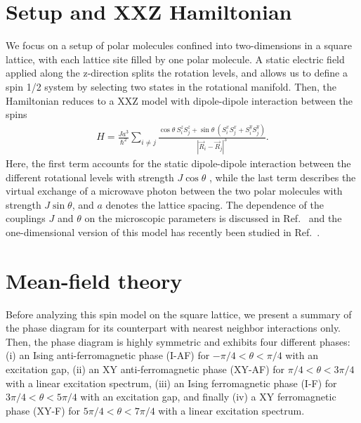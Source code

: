 \section{Setup and XXZ Hamiltonian}
We focus on a setup of polar molecules confined into two-dimensions in a square lattice,
with each lattice site filled by one polar molecule. A static electric field applied along
the z-direction splits the rotation levels, and allows us to define a spin 1/2 system by selecting
two states in the rotational manifold. Then, the Hamiltonian reduces to a XXZ model with dipole-dipole interaction
between the spins \cite{Gorshkov2011}
%
\begin{align}
H = \frac{J a^3}{\hbar^2} \sum_{i \neq j} \frac{\cos \theta \:
S^{z}_{i}S^{z}_{j}+ \sin \theta
\: ( S^{x}_{i} S^{x}_{j} + S^{y}_{i} S^{y}_{j} ) }{|{\vec R}_{i} - {\vec R}_{j}|^3}.
\end{align}
%
Here, the first term accounts for the static dipole-dipole
interaction between the different rotational levels with strength $J \cos \theta$ , while the last term
describes the virtual exchange of a microwave photon between the two polar molecules with
strength $J \sin \theta$, and $a$ denotes the lattice spacing.
The dependence of the couplings $J$ and $\theta$ on the microscopic
parameters is discussed in Ref.~\Cite{Muller2010,Gorshkov2011,Gorshkov2011c} and the one-dimensional version of this model has recently been studied in Ref.~\cite{Hauke2010}.

\section{Mean-field theory}

Before analyzing this spin model on the square lattice, we present a
summary of the phase diagram
for its counterpart with nearest neighbor interactions only.
Then, the phase diagram is highly symmetric and
exhibits four different phases: (i) an Ising
anti-ferromagnetic phase (I-AF) for $-\pi/4 < \theta < \pi/4$ with an
excitation gap, (ii) an XY anti-ferromagnetic phase (XY-AF) for $\pi/4 < \theta
< 3\pi/4$ with a linear excitation spectrum, (iii) an Ising ferromagnetic phase
(I-F) for $3 \pi/4 < \theta < 5\pi/4$ with an excitation gap, and finally (iv) a
XY ferromagnetic phase (XY-F) for $5 \pi/4 < \theta < 7\pi/4$ with a linear
excitation spectrum.

